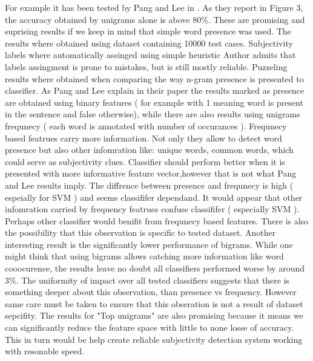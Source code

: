 For example it has been tested by Pang and Lee in \cite{PangLee2002}. As they report in Figure 3, the accuracy obtained by unigrams 
alone is above 80\%. These are promising and suprising results if we keep in mind that simple word presence was used. The results 
where obtained using dataset containing 10000 test cases. Subjectivity labels where automatically assinged using simple heuristic
Author admits that labels assingment is prone to mistakes, but is still mostly reliable. Puzzeling results where obtained when 
comparing the way n-gram presence is presented to classifier. As Pang and Lee explain in their paper the results marked as presence are 
obtained using binary features ( for example with 1 meaning word is present in the sentence and false otherwise), while there are also 
results using unigrams frequnecy ( each word is annotated with number of occurances ). Frequnecy based featrues carry more information.
Not only they allow to detect word presence but also other infomration like: unique words, common words, which could serve as subjectivity clues.
Classifier should perform better when it is presented with more informative feature vector,however that is not what Pang and Lee results imply. 
The diffrence between presence and frequnecy is high ( espeially for SVM ) and seems classififer dependand. It would appear that other
infomration carried by frequency featrues confuse classififer ( especially SVM ). Perhaps other classifier would benifit from frequnecy 
based features. There is also the possibility that this observation is specific to tested dataset. Another interesting result is the significantly 
lower performance of bigrams. While one might think that using bigrams allows catching more information like word cooocurence, the results leave 
no doubt all classifiers performed worse by around 3\%. The uniformity of impact over all tested classifiers suggests that there is 
something deeper about this observation, than presence vs frequency. However same care must be taken to ensure that this obseration is not a 
result of dataset sepcifity. The results for "Top unigrams" are also promising because it means we can significantly reduce the feature
space with little to none losse of accuracy. This in turn would be help create reliable subjectivity detection system working with resonable speed.

